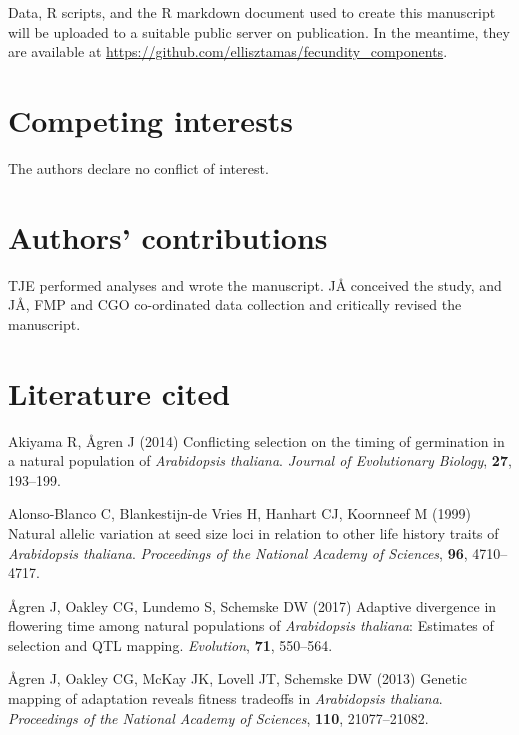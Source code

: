 \documentclass[]{article}
\begin{document}
Data, R scripts, and the R markdown document used to create this manuscript will be uploaded to a suitable public server on publication. In the meantime, they are available at \url{https://github.com/ellisztamas/fecundity_components}.

\hypertarget{competing-interests}{%
\section{Competing interests}\label{competing-interests}}

The authors declare no conflict of interest.

\hypertarget{authors-contributions}{%
\section{Authors' contributions}\label{authors-contributions}}

TJE performed analyses and wrote the manuscript. JÅ conceived the study, and JÅ, FMP and CGO co-ordinated data collection and critically revised the manuscript.

\hypertarget{literature-cited}{%
\section{Literature cited}\label{literature-cited}}

\hypertarget{refs}{}
\leavevmode\hypertarget{ref-akiyama2014conflicting}{}%
Akiyama R, Ågren J (2014) Conflicting selection on the timing of germination in a natural population of \emph{Arabidopsis thaliana}. \emph{Journal of Evolutionary Biology}, \textbf{27}, 193--199.

\leavevmode\hypertarget{ref-alonso1999natural}{}%
Alonso-Blanco C, Blankestijn-de Vries H, Hanhart CJ, Koornneef M (1999) Natural allelic variation at seed size loci in relation to other life history traits of \emph{Arabidopsis thaliana}. \emph{Proceedings of the National Academy of Sciences}, \textbf{96}, 4710--4717.

\leavevmode\hypertarget{ref-agren_flowering_time}{}%
Ågren J, Oakley CG, Lundemo S, Schemske DW (2017) Adaptive divergence in flowering time among natural populations of \emph{Arabidopsis thaliana}: Estimates of selection and QTL mapping. \emph{Evolution}, \textbf{71}, 550--564.

\leavevmode\hypertarget{ref-agren_genetic_2013}{}%
Ågren J, Oakley CG, McKay JK, Lovell JT, Schemske DW (2013) Genetic mapping of adaptation reveals fitness tradeoffs in \emph{Arabidopsis thaliana}. \emph{Proceedings of the National Academy of Sciences}, \textbf{110}, 21077--21082.
\end{document}

